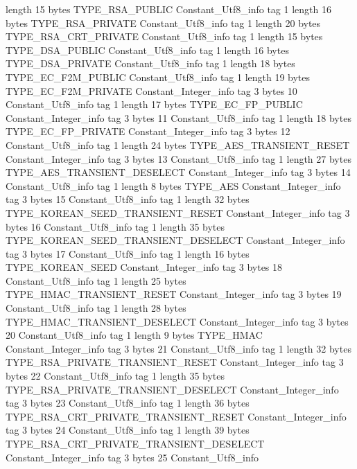{{{			length	15
			bytes	TYPE_RSA_PUBLIC
		}
		Constant_Utf8_info {
			tag	1
			length	16
			bytes	TYPE_RSA_PRIVATE
		}
		Constant_Utf8_info {
			tag	1
			length	20
			bytes	TYPE_RSA_CRT_PRIVATE
		}
		Constant_Utf8_info {
			tag	1
			length	15
			bytes	TYPE_DSA_PUBLIC
		}
		Constant_Utf8_info {
			tag	1
			length	16
			bytes	TYPE_DSA_PRIVATE
		}
		Constant_Utf8_info {
			tag	1
			length	18
			bytes	TYPE_EC_F2M_PUBLIC
		}
		Constant_Utf8_info {
			tag	1
			length	19
			bytes	TYPE_EC_F2M_PRIVATE
		}
		Constant_Integer_info {
			tag	3
			bytes	10
		}
		Constant_Utf8_info {
			tag	1
			length	17
			bytes	TYPE_EC_FP_PUBLIC
		}
		Constant_Integer_info {
			tag	3
			bytes	11
		}
		Constant_Utf8_info {
			tag	1
			length	18
			bytes	TYPE_EC_FP_PRIVATE
		}
		Constant_Integer_info {
			tag	3
			bytes	12
		}
		Constant_Utf8_info {
			tag	1
			length	24
			bytes	TYPE_AES_TRANSIENT_RESET
		}
		Constant_Integer_info {
			tag	3
			bytes	13
		}
		Constant_Utf8_info {
			tag	1
			length	27
			bytes	TYPE_AES_TRANSIENT_DESELECT
		}
		Constant_Integer_info {
			tag	3
			bytes	14
		}
		Constant_Utf8_info {
			tag	1
			length	8
			bytes	TYPE_AES
		}
		Constant_Integer_info {
			tag	3
			bytes	15
		}
		Constant_Utf8_info {
			tag	1
			length	32
			bytes	TYPE_KOREAN_SEED_TRANSIENT_RESET
		}
		Constant_Integer_info {
			tag	3
			bytes	16
		}
		Constant_Utf8_info {
			tag	1
			length	35
			bytes	TYPE_KOREAN_SEED_TRANSIENT_DESELECT
		}
		Constant_Integer_info {
			tag	3
			bytes	17
		}
		Constant_Utf8_info {
			tag	1
			length	16
			bytes	TYPE_KOREAN_SEED
		}
		Constant_Integer_info {
			tag	3
			bytes	18
		}
		Constant_Utf8_info {
			tag	1
			length	25
			bytes	TYPE_HMAC_TRANSIENT_RESET
		}
		Constant_Integer_info {
			tag	3
			bytes	19
		}
		Constant_Utf8_info {
			tag	1
			length	28
			bytes	TYPE_HMAC_TRANSIENT_DESELECT
		}
		Constant_Integer_info {
			tag	3
			bytes	20
		}
		Constant_Utf8_info {
			tag	1
			length	9
			bytes	TYPE_HMAC
		}
		Constant_Integer_info {
			tag	3
			bytes	21
		}
		Constant_Utf8_info {
			tag	1
			length	32
			bytes	TYPE_RSA_PRIVATE_TRANSIENT_RESET
		}
		Constant_Integer_info {
			tag	3
			bytes	22
		}
		Constant_Utf8_info {
			tag	1
			length	35
			bytes	TYPE_RSA_PRIVATE_TRANSIENT_DESELECT
		}
		Constant_Integer_info {
			tag	3
			bytes	23
		}
		Constant_Utf8_info {
			tag	1
			length	36
			bytes	TYPE_RSA_CRT_PRIVATE_TRANSIENT_RESET
		}
		Constant_Integer_info {
			tag	3
			bytes	24
		}
		Constant_Utf8_info {
			tag	1
			length	39
			bytes	TYPE_RSA_CRT_PRIVATE_TRANSIENT_DESELECT
		}
		Constant_Integer_info {
			tag	3
			bytes	25
		}
		Constant_Utf8_info {
}}}
